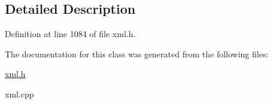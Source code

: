 \subsection{Detailed Description}


Definition at line 1084 of file xml.h.



The documentation for this class was generated from the following files:\begin{DoxyCompactItemize}
\item 
\hyperlink{xml_8h}{xml.h}\item 
xml.cpp\end{DoxyCompactItemize}
